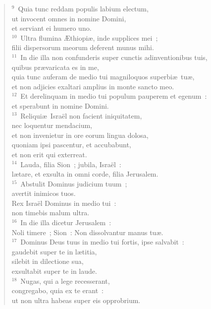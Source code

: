 \begin{verse}${}^{9}$~Quia tunc reddam populis labium electum,\\ ut invocent omnes in nomine Domini,\\ et serviant ei humero uno.\\
${}^{10}$~Ultra flumina \AE thiopi\ae , inde supplices mei~;\\ filii dispersorum meorum deferent munus mihi.\\
${}^{11}$~In die illa non confunderis super cunctis adinventionibus tuis,\\ quibus pr\ae varicata es in me,\\ quia tunc auferam de medio tui magniloquos superbi\ae\ tu\ae ,\\ et non adjicies exaltari amplius in monte sancto meo.\\
${}^{12}$~Et derelinquam in medio tui populum pauperem et egenum~:\\ et sperabunt in nomine Domini.\\
${}^{13}$~Reliqui\ae\ Isra\"el non facient iniquitatem,\\ nec loquentur mendacium,\\ et non invenietur in ore eorum lingua dolosa,\\ quoniam ipsi pascentur, et accubabunt,\\ et non erit qui exterreat.\\
${}^{14}$~Lauda, filia Sion~; jubila, Isra\"el~:\\ l\ae tare, et exsulta in omni corde, filia Jerusalem.\\
${}^{15}$~Abstulit Dominus judicium tuum~;\\ avertit inimicos tuos.\\ Rex Isra\"el Dominus in medio tui~:\\ non timebis malum ultra.\\
${}^{16}$~In die illa dicetur Jerusalem~:\\ Noli timere~; Sion~: Non dissolvantur manus tu\ae .\\
${}^{17}$~Dominus Deus tuus in medio tui fortis, ipse salvabit~:\\ gaudebit super te in l\ae titia,\\ silebit in dilectione sua,\\ exsultabit super te in laude.\\
${}^{18}$~Nugas, qui a lege recesserant,\\ congregabo, quia ex te erant~:\\ ut non ultra habeas super eis opprobrium.\\

\end{verse}
